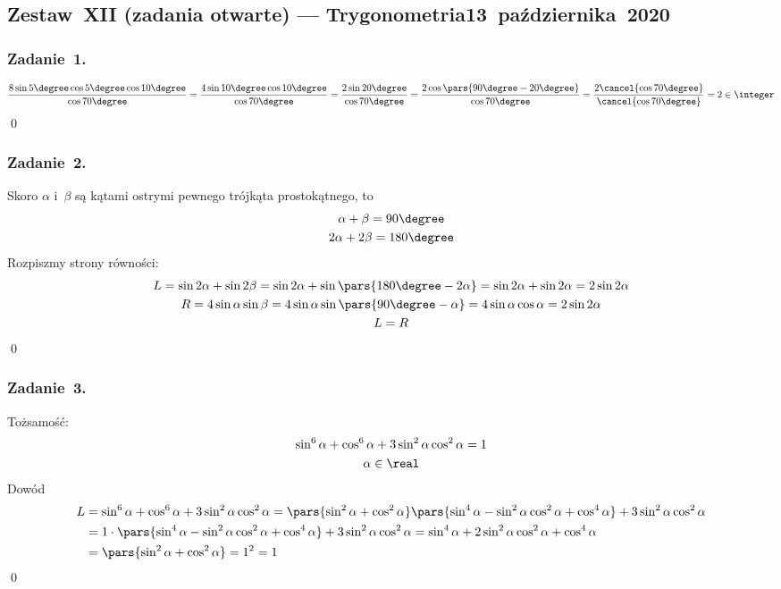 \subsection*{Zestaw~XII (zadania otwarte) --- Trygonometria\qquad{}13~października~2020}
\subsubsection*{Zadanie~1.}
\begin{equation*}
    \frac{8\sin5\degree \cos5\degree \cos10\degree}{\cos70\degree}
        = \frac{4\sin10\degree \cos10\degree}{\cos70\degree}
        = \frac{2\sin20\degree}{\cos70\degree}
        = \frac{2\cos\pars{90\degree - 20\degree}}{\cos70\degree}
        = \frac{2\cancel{\cos70\degree}}{\cancel{\cos70\degree}}
        = 2 \in \integer
\end{equation*}
\qed
\subsubsection*{Zadanie~2.}
Skoro \(\alpha\) i~\(\beta\) są kątami ostrymi pewnego trójkąta prostokątnego, to
\begin{gather*}
    \alpha + \beta = 90\degree\\
    2\alpha + 2\beta = 180\degree
\end{gather*}
Rozpiszmy strony równości:
\begin{gather*}
    L = \sin2\alpha + \sin2\beta = \sin2\alpha + \sin\pars{180\degree - 2\alpha} = \sin2\alpha + \sin2\alpha = 2\sin2\alpha\\
    R = 4\sin\alpha\sin\beta = 4\sin\alpha\sin\pars{90\degree - \alpha} = 4\sin\alpha\cos\alpha = 2\sin2\alpha\\
    L = R
\end{gather*}
\qed
\subsubsection*{Zadanie~3.}
Tożsamość:
\begin{gather*}
    \sin^6\alpha + \cos^6\alpha + 3\sin^2\alpha\cos^2\alpha = 1\\
    \alpha \in \real
\end{gather*}
Dowód
\begin{equation*}
    \begin{split}
        L
            &= \sin^6\alpha + \cos^6\alpha + 3\sin^2\alpha\cos^2\alpha
            = \pars{\sin^2\alpha + \cos^2\alpha}\pars{\sin^4\alpha - \sin^2\alpha\cos^2\alpha + \cos^4\alpha} + 3\sin^2\alpha\cos^2\alpha\\
            &= 1 \cdot \pars{\sin^4\alpha - \sin^2\alpha\cos^2\alpha + \cos^4\alpha} + 3\sin^2\alpha\cos^2\alpha
            = \sin^4\alpha + 2\sin^2\alpha\cos^2\alpha + \cos^4\alpha\\
            &= \pars{\sin^2\alpha + \cos^2\alpha}
            = 1^2
            = 1
    \end{split}
\end{equation*}
\qed

